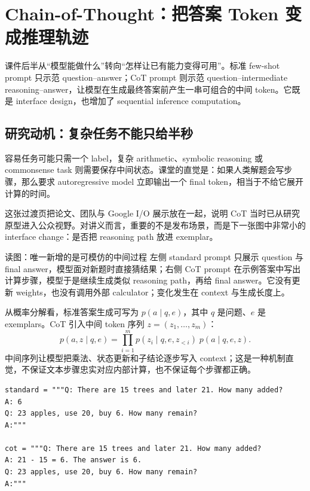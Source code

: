 \section{Chain-of-Thought：把答案 Token 变成推理轨迹}

课件后半从“模型能做什么”转向“怎样让已有能力变得可用”。标准 few-shot prompt 只示范 question--answer；CoT prompt 则示范 question--intermediate reasoning--answer，让模型在生成最终答案前产生一串可组合的中间 token。它既是 interface design，也增加了 sequential inference computation。

\subsection{研究动机：复杂任务不能只给半秒}

容易任务可能只需一个 label，复杂 arithmetic、symbolic reasoning 或 commonsense task 则需要保存中间状态。课堂的直觉是：如果人类解题会写步骤，那么要求 autoregressive model 立即输出一个 final token，相当于不给它展开计算的时间。


这张过渡页把论文、团队与 Google I/O 展示放在一起，说明 CoT 当时已从研究原型进入公众视野。对讲义而言，重要的不是发布场景，而是下一张图中非常小的 interface change：是否把 reasoning path 放进 exemplar。


\begin{knowledgebox}{读图：唯一新增的是可模仿的中间过程}
左侧 standard prompt 只展示 question 与 final answer，模型面对新题时直接猜结果；右侧 CoT prompt 在示例答案中写出计算步骤，模型于是继续生成类似 reasoning path，再给 final answer。它没有更新 weights，也没有调用外部 calculator；变化发生在 context 与生成长度上。
\end{knowledgebox}

从概率分解看，标准答案生成可写为 $p(a\mid q,e)$，其中 $q$ 是问题、$e$ 是 exemplars。CoT 引入中间 token 序列 $z=(z_1,\ldots,z_m)$：
\[
p(a,z\mid q,e)=\prod_{i=1}^{m}p(z_i\mid q,e,z_{<i})\;p(a\mid q,e,z).
\]
中间序列让模型把乘法、状态更新和子结论逐步写入 context；这是一种机制直觉，不保证文本步骤忠实对应内部计算，也不保证每个步骤都正确。

\begin{lstlisting}[caption={标准 few-shot 与 CoT prompt 的最小差别}]
standard = """Q: There are 15 trees and later 21. How many added?
A: 6
Q: 23 apples, use 20, buy 6. How many remain?
A:"""

cot = """Q: There are 15 trees and later 21. How many added?
A: 21 - 15 = 6. The answer is 6.
Q: 23 apples, use 20, buy 6. How many remain?
A:"""
\end{lstlisting}

